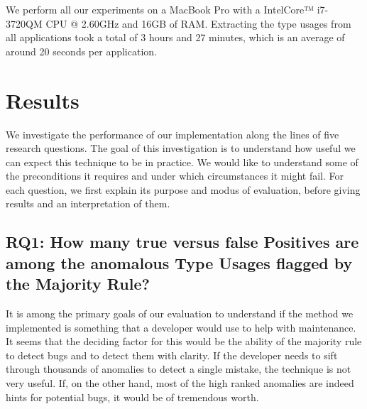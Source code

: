 We perform all our experiments on a MacBook Pro with a Intel\textregistered Core™ i7-3720QM CPU @ 2.60GHz and 16GB of RAM.
Extracting the type usages from all applications took a total of 3 hours and 27 minutes, which is an average of around 20 seconds per application.


\section{Results}


We investigate the performance of our implementation along the lines of five research questions.
The goal of this investigation is to understand how useful we can expect this technique to be in practice.
We would like to understand some of the preconditions it requires and under which circumstances it might fail.
For each question, we first explain its purpose and modus of evaluation, before giving results and an interpretation of them.

\subsection{RQ1: How many true versus false Positives are among the anomalous Type Usages flagged by the Majority Rule?}

It is among the primary goals of our evaluation to understand if the method we implemented is something that a developer would use to help with maintenance.
It seems that the deciding factor for this would be the ability of the majority rule to detect bugs and to detect them with clarity.
If the developer needs to sift through thousands of anomalies to detect a single mistake, the technique is not very useful.
If, on the other hand, most of the high ranked anomalies are indeed hints for potential bugs, it would be of tremendous worth.

